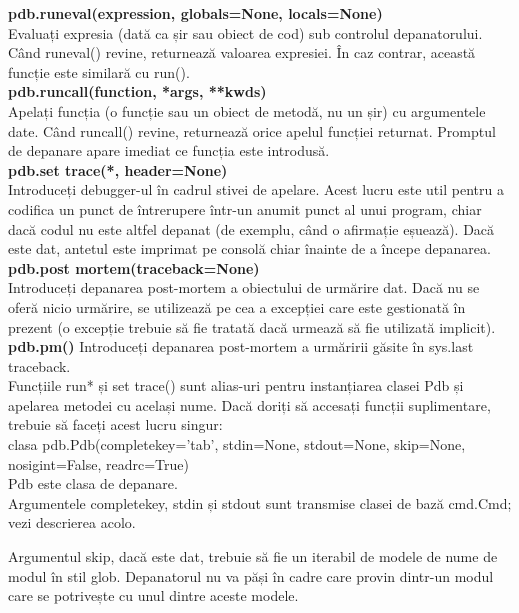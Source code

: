 \documentclass[oneside,20pt]{article}          %
\begin{document}
\textbf{pdb.runeval(expression, globals=None, locals=None)}\\
Evaluați expresia (dată ca șir sau obiect de cod) sub controlul depanatorului. Când runeval() revine, returnează valoarea expresiei. În caz contrar, această funcție este similară cu run().\\
\textbf{
pdb.runcall(function, *args, **kwds)}\\
Apelați funcția (o funcție sau un obiect de metodă, nu un șir) cu argumentele date. Când runcall() revine, returnează orice apelul funcției returnat. Promptul de depanare apare imediat ce funcția este introdusă.\\
\textbf{pdb.set trace(*, header=None)}\\
Introduceți debugger-ul în cadrul stivei de apelare. Acest lucru este util pentru a codifica un punct de întrerupere într-un anumit punct al unui program, chiar dacă codul nu este altfel depanat (de exemplu, când o afirmație eșuează). Dacă este dat, antetul este imprimat pe consolă chiar înainte de a începe depanarea.\\


\textbf{pdb.post mortem(traceback=None)}\\
Introduceți depanarea post-mortem a obiectului de urmărire dat. Dacă nu se oferă nicio urmărire, se utilizează pe cea a excepției care este gestionată în prezent (o excepție trebuie să fie tratată dacă urmează să fie utilizată implicit).\\
\textbf{
pdb.pm()}
Introduceți depanarea post-mortem a urmăririi găsite în sys.last traceback.\\

Funcțiile run* și set trace() sunt alias-uri pentru instanțiarea clasei Pdb și apelarea metodei cu același nume. Dacă doriți să accesați funcții suplimentare, trebuie să faceți acest lucru singur:\\

clasa pdb.Pdb(completekey='tab', stdin=None, stdout=None, skip=None, nosigint=False, readrc=True)\\
Pdb este clasa de depanare.\\

Argumentele completekey, stdin și stdout sunt transmise clasei de bază cmd.Cmd; vezi descrierea acolo.

Argumentul skip, dacă este dat, trebuie să fie un iterabil de modele de nume de modul în stil glob. Depanatorul nu va păși în cadre care provin dintr-un modul care se potrivește cu unul dintre aceste modele. 
\end{document}
